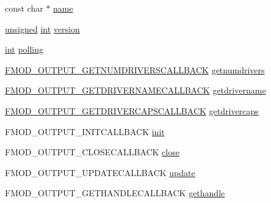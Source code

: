 \begin{DoxyCompactItemize}
\item 
const char $\ast$ \hyperlink{struct_f_m_o_d___o_u_t_p_u_t___d_e_s_c_r_i_p_t_i_o_n_ab2d1c75ad80fc949101a31310f6866fe}{name}
\item 
\hyperlink{_free_image_8h_a425076c7067a1b5166e2cc530e914814}{unsigned} \hyperlink{wglew_8h_a500a82aecba06f4550f6849b8099ca21}{int} \hyperlink{struct_f_m_o_d___o_u_t_p_u_t___d_e_s_c_r_i_p_t_i_o_n_a1ffa1ceb39e6b22a0887819f479cbdd9}{version}
\item 
\hyperlink{wglew_8h_a500a82aecba06f4550f6849b8099ca21}{int} \hyperlink{struct_f_m_o_d___o_u_t_p_u_t___d_e_s_c_r_i_p_t_i_o_n_a523fa9268311d2f39464bc0d8bdacf53}{polling}
\item 
\hyperlink{fmod__output_8h_a6a18a9f4871ec535cfb0068a4df13669}{F\-M\-O\-D\-\_\-\-O\-U\-T\-P\-U\-T\-\_\-\-G\-E\-T\-N\-U\-M\-D\-R\-I\-V\-E\-R\-S\-C\-A\-L\-L\-B\-A\-C\-K} \hyperlink{struct_f_m_o_d___o_u_t_p_u_t___d_e_s_c_r_i_p_t_i_o_n_ae5ed5731da53559226a6dc0114a67101}{getnumdrivers}
\item 
\hyperlink{fmod__output_8h_a5e4554ce093c66dd8a05cfc6bcc7127a}{F\-M\-O\-D\-\_\-\-O\-U\-T\-P\-U\-T\-\_\-\-G\-E\-T\-D\-R\-I\-V\-E\-R\-N\-A\-M\-E\-C\-A\-L\-L\-B\-A\-C\-K} \hyperlink{struct_f_m_o_d___o_u_t_p_u_t___d_e_s_c_r_i_p_t_i_o_n_ade7eeb2121ade877145b71e77c97d8ad}{getdrivername}
\item 
\hyperlink{fmod__output_8h_a0891aaf312d2d6e7e8e4155723c93c40}{F\-M\-O\-D\-\_\-\-O\-U\-T\-P\-U\-T\-\_\-\-G\-E\-T\-D\-R\-I\-V\-E\-R\-C\-A\-P\-S\-C\-A\-L\-L\-B\-A\-C\-K} \hyperlink{struct_f_m_o_d___o_u_t_p_u_t___d_e_s_c_r_i_p_t_i_o_n_a10a61f364d202bc6d4f298ef41b40fb9}{getdrivercaps}
\item 
F\-M\-O\-D\-\_\-\-O\-U\-T\-P\-U\-T\-\_\-\-I\-N\-I\-T\-C\-A\-L\-L\-B\-A\-C\-K \hyperlink{struct_f_m_o_d___o_u_t_p_u_t___d_e_s_c_r_i_p_t_i_o_n_a16015d5d334e75322b95adebaac20139}{init}
\item 
F\-M\-O\-D\-\_\-\-O\-U\-T\-P\-U\-T\-\_\-\-C\-L\-O\-S\-E\-C\-A\-L\-L\-B\-A\-C\-K \hyperlink{struct_f_m_o_d___o_u_t_p_u_t___d_e_s_c_r_i_p_t_i_o_n_a5e0e9b99b7b8011bb248e58ad82b4fa8}{close}
\item 
F\-M\-O\-D\-\_\-\-O\-U\-T\-P\-U\-T\-\_\-\-U\-P\-D\-A\-T\-E\-C\-A\-L\-L\-B\-A\-C\-K \hyperlink{struct_f_m_o_d___o_u_t_p_u_t___d_e_s_c_r_i_p_t_i_o_n_a3c61df7f0da61edd058317a0966c04bf}{update}
\item 
F\-M\-O\-D\-\_\-\-O\-U\-T\-P\-U\-T\-\_\-\-G\-E\-T\-H\-A\-N\-D\-L\-E\-C\-A\-L\-L\-B\-A\-C\-K \hyperlink{struct_f_m_o_d___o_u_t_p_u_t___d_e_s_c_r_i_p_t_i_o_n_a2029938a3daf763ac99e971bf0a4ce40}{gethandle}

\end{DoxyCompactItemize}
